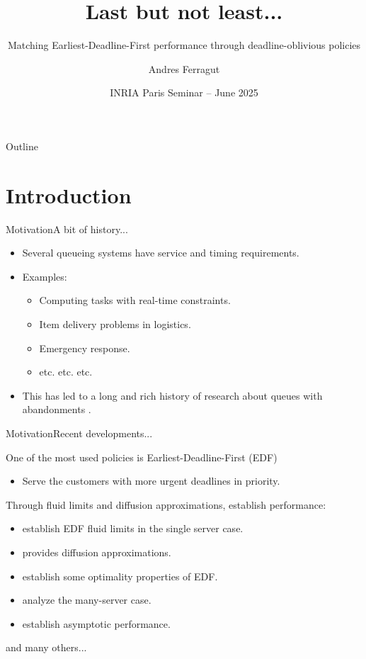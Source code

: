\documentclass[aspectratio=169]{beamer}
\title{Last but not least...}
\subtitle{Matching Earliest-Deadline-First performance through deadline-oblivious policies}
\author[Andres Ferragut, Universidad ORT Uruguay]{Andres Ferragut}
\institute{Universidad ORT Uruguay}
\date[INRIA Paris Seminar -- Jun 2025]{INRIA Paris Seminar -- June 2025}
\renewcommand{\cite}{\citep}
\newenvironment*{myitem}[1][1.5em]{\begin{itemize}\setlength{\itemsep}{#1}}{\end{itemize}}
\begin{document}
\frame[plain]{\titlepage}

\begin{frame}{Outline}
\tableofcontents
\end{frame}

\section{Introduction}

\begin{frame}{Motivation}{A bit of history...}

	\begin{myitem}
		\item Several queueing systems have service and \alert{timing} requirements.
		\item Examples:
		\begin{itemize}
			\item Computing tasks with real-time constraints.
			\item Item delivery problems in logistics.
			\item Emergency response.
			\item etc. etc. etc.
		\end{itemize}
		\item This has led to a long and rich history of research about \alert{queues with abandonments} \cite{barrer1957queuing,stanford1979reneging,baccellietal1984single}.
	\end{myitem}

\end{frame}

\begin{frame}{Motivation}{Recent developments...}

	One of the most used policies is \alert{Earliest-Deadline-First (EDF)}
	\begin{itemize}
		\item Serve the customers with more urgent deadlines in priority.
	\end{itemize}
	\vfill
	\pause
	
	Through fluid limits and diffusion approximations, establish performance:
	\begin{itemize}
		\item \cite{decreusefondmoyal2005fluid} establish EDF fluid limits in the single server case.
		\item \cite{kruketal2011heavy} provides diffusion approximations.
		\item \cite{moyal2013queues} establish some optimality properties of EDF.
		\item \cite{kangramanan2010fluid, kangramanan2012asymptotic} analyze the many-server case.
		\item \cite{ataretal2018law,ataretal2023long} establish asymptotic performance.
	\end{itemize}
	\vfill
	and many others...
\end{frame}
\end{document}
